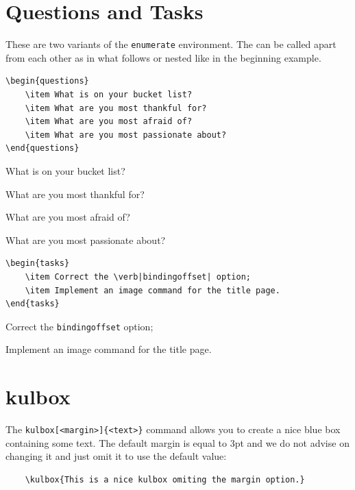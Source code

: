 \documentclass[oneside,a4paper,11pt,explicit]{book}
\begin{document}
\section{Questions and Tasks}
These are two variants of the \verb|enumerate| environment. The can be called apart from each other as in what follows or nested like in the beginning example.
\begin{lstlisting}
\begin{questions}
    \item What is on your bucket list?
    \item What are you most thankful for?
    \item What are you most afraid of?
    \item What are you most passionate about?
\end{questions}
\end{lstlisting}
\begin{questions}
    \item What is on your bucket list?
    \item What are you most thankful for?
    \item What are you most afraid of?
    \item What are you most passionate about?
\end{questions}

\begin{lstlisting}
\begin{tasks}
    \item Correct the \verb|bindingoffset| option;
    \item Implement an image command for the title page.
\end{tasks}
\end{lstlisting}
\begin{tasks}
    \item Correct the \verb|bindingoffset| option;
    \item Implement an image command for the title page.
\end{tasks}

\section{kulbox}
The \verb|kulbox[<margin>]{<text>}| command allows you to create a nice blue box containing some text. The default margin is equal to 3pt and we do not advise on changing it and just omit it to use the default value:
\begin{lstlisting}
    \kulbox{This is a nice kulbox omiting the margin option.}
\end{lstlisting}
\end{document}
